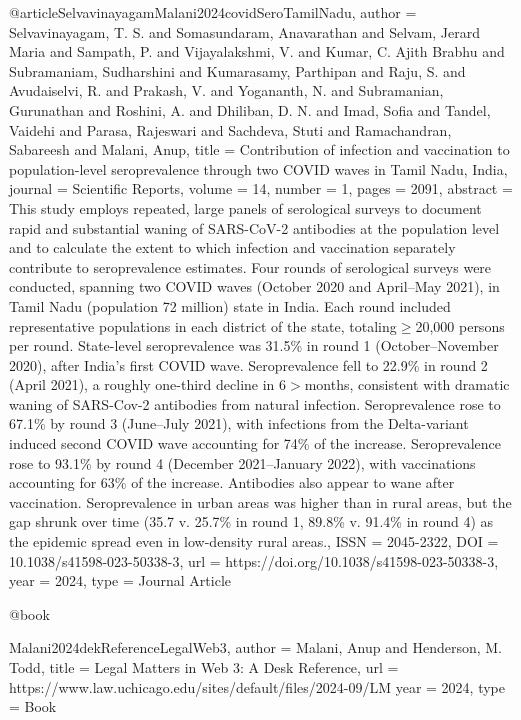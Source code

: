 {@article{SelvavinayagamMalani2024covidSeroTamilNadu,
   author = {Selvavinayagam, T. S. and Somasundaram, Anavarathan and Selvam, Jerard Maria and Sampath, P. and Vijayalakshmi, V. and Kumar, C. Ajith Brabhu and Subramaniam, Sudharshini and Kumarasamy, Parthipan and Raju, S. and Avudaiselvi, R. and Prakash, V. and Yogananth, N. and Subramanian, Gurunathan and Roshini, A. and Dhiliban, D. N. and Imad, Sofia and Tandel, Vaidehi and Parasa, Rajeswari and Sachdeva, Stuti and Ramachandran, Sabareesh and Malani, Anup},
   title = {Contribution of infection and vaccination to population-level seroprevalence through two COVID waves in Tamil Nadu, India},
   journal = {Scientific Reports},
   volume = {14},
   number = {1},
   pages = {2091},
   abstract = {This study employs repeated, large panels of serological surveys to document rapid and substantial waning of SARS-CoV-2 antibodies at the population level and to calculate the extent to which infection and vaccination separately contribute to seroprevalence estimates. Four rounds of serological surveys were conducted, spanning two COVID waves (October 2020 and April–May 2021), in Tamil Nadu (population 72 million) state in India. Each round included representative populations in each district of the state, totaling$\ge$20,000 persons per round. State-level seroprevalence was 31.5\% in round 1 (October–November 2020), after India’s first COVID wave. Seroprevalence fell to 22.9\% in round 2 (April 2021), a roughly one-third decline in 6$>$months, consistent with dramatic waning of SARS-Cov-2 antibodies from natural infection. Seroprevalence rose to 67.1\% by round 3 (June–July 2021), with infections from the Delta-variant induced second COVID wave accounting for 74\% of the increase. Seroprevalence rose to 93.1\% by round 4 (December 2021–January 2022), with vaccinations accounting for 63\% of the increase. Antibodies also appear to wane after vaccination. Seroprevalence in urban areas was higher than in rural areas, but the gap shrunk over time (35.7 v. 25.7\% in round 1, 89.8\% v. 91.4\% in round 4) as the epidemic spread even in low-density rural areas.},
   ISSN = {2045-2322},
   DOI = {10.1038/s41598-023-50338-3},
   url = {https://doi.org/10.1038/s41598-023-50338-3},
   year = {2024},
   type = {Journal Article}
}


@book{Malani2024dekReferenceLegalWeb3,
   author = {Malani, Anup and Henderson, M. Todd},
   title = {Legal Matters in Web 3: A Desk Reference},
   url = {https://www.law.uchicago.edu/sites/default/files/2024-09/LM%
   year = {2024},
   type = {Book}
}

}}
